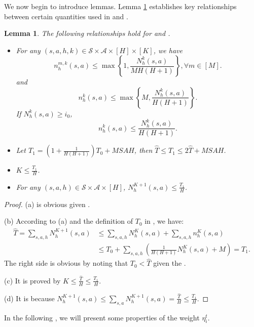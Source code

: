 \documentclass{article}
\newtheorem{lemma}{Lemma}[section]
\newcommand{\sah}{\mathcal{S} \times \mathcal{A} \times [H]}
\begin{document}
We now begin to introduce lemmas. Lemma \ref{lemma_relationship_TK} establishes key relationships between certain quantities used in  and .  
	\begin{lemma}\label{lemma_relationship_TK}
		The following relationships hold for  and .
		\begin{itemize}
			\item[(a)] For any $(s,a,h,k)\in \sah\times [K]$, we have
			\begin{equation*}
				n_h^{m,k}(s,a)\leq \max\left\{1,\frac{N_h^k(s,a)}{MH(H+1)}\right\},\forall m\in [M].
			\end{equation*}
			and 
			\begin{equation*}
				n_h^{k}(s,a)\leq \max\left\{M,\frac{N_h^k(s,a)}{H(H+1)}\right\}.
			\end{equation*}
			If $N_h^{k}(s,a)\geq i_0$,
			$$n_h^k(s,a)\leq \frac{N_h^k(s,a)}{H(H+1)}.$$
			\item[(b)] Let $T_1 = \left(1+\frac{1}{H(H+1)}\right)T_0 + MSAH$, then $\hat{T}\leq T_1 \leq 2\hat{T} + MSAH$.
                \item[(c)] $K\leq \frac{T_1}{H}$.
                \item[(d)] For any $(s,a,h)\in \sah$, $N_h^{K+1}(s,a) \leq \frac{T_1}{H}$.
		\end{itemize}
		
	\end{lemma}
    \begin{proof}
		(a) is obvious given .
        
        (b) According to (a) and the definition of $T_0$ in , we have:
    \begin{align*}
        \hat{T} = \sum_{s,a,h} N_h^{K+1}(s,a) &\leq  \sum_{s,a,h} N_h^{K}(s,a)+ \sum_{s,a,h} n_h^{K}(s,a) \\
        &\leq T_0  + \sum_{s,a,h} \left(\frac{1}{H(H+1)}N_h^{K}(s,a)+M\right)= T_1.
    \end{align*}
    The right side is obvious by noting that $T_0 < \hat{T}$ given the .
    
   (c) It is proved by $K \leq \frac{\hat{T}}{H} \leq \frac{T_1}{H}$.
   
   (d) It is because $N_h^{K+1}(s,a) \leq \sum_{s,a}N_h^{K+1}(s,a) = \frac{\hat{T}}{H} \leq \frac{T_1}{H}$.
	\end{proof}
In the following , we will present some properties of the weight $\eta_i^t$.
\end{document}
